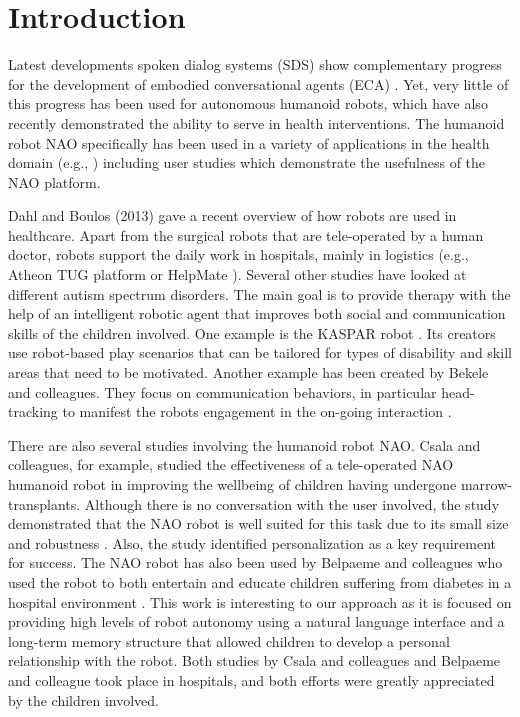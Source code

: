 \documentclass[letterpaper]{article}
\begin{document}

\section{Introduction} \label{intro}

Latest developments spoken dialog systems (SDS) show complementary progress for the development of  embodied conversational agents (ECA) \cite{YASCLL14}. Yet, very little of
this progress has been used for autonomous humanoid robots, which have also recently demonstrated the ability
to serve in health interventions. The
humanoid robot NAO specifically has been used in a variety of applications in the health domain (e.g.,
\cite{MAJA13}) including user studies which demonstrate the usefulness of the NAO platform.

Dahl and Boulos (2013) \nocite{robotics3010001} gave a recent overview of how robots are used in
healthcare. Apart from the  surgical robots that are tele-operated by a human doctor, robots support
the daily work in hospitals, mainly in logistics (e.g., Atheon TUG platform \cite{bloss2011mobile}
or HelpMate \cite{evans1998helpmate}). Several other studies have looked at different autism
spectrum disorders. The main goal is to provide therapy with the help of an intelligent robotic
agent that improves both social and communication skills of the children involved. One example is
the KASPAR robot \cite{robins2012scenarios}. Its creators use robot-based play scenarios that can
be tailored for types of disability and skill areas that need to be motivated. Another example has
been created by Bekele and colleagues. They focus on communication behaviors, in particular
head-tracking to manifest the robots engagement in the on-going interaction \cite{bekele2013step}.  

There are also several studies involving the humanoid robot NAO. Csala and colleagues, for example,
studied the effectiveness of a tele-operated NAO humanoid robot in improving the wellbeing of
children having undergone marrow-transplants. Although there is no conversation with the user
involved, the study demonstrated that the NAO robot is well suited for this task due to its small
size and robustness \cite{Csala2012}. Also, the study identified personalization as a key
requirement for success. The NAO robot has also been used by Belpaeme and colleagues who used the
robot to both entertain and educate children suffering from diabetes in a hospital environment
\cite{belpaeme2012multimodal}. This work is interesting to our approach as it is focused on
providing high levels of robot autonomy using a natural language interface and a long-term memory
structure that allowed children to develop a personal relationship with the robot. Both studies by
Csala and colleagues and Belpaeme and colleague took place in hospitals, and both efforts were
greatly appreciated by the children involved.
\end{document}
